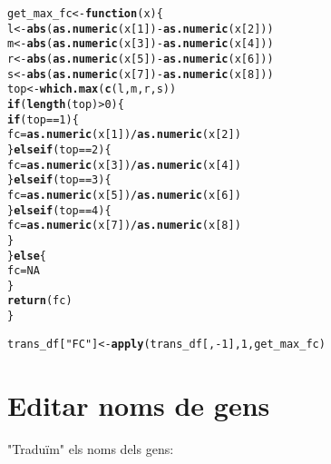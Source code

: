 \documentclass{article}\usepackage[]{graphicx}\usepackage[]{color}
\makeatletter
\newcommand{\hlnum}[1]{\textcolor[rgb]{0.686,0.059,0.569}{#1}}%
\newcommand{\hlstr}[1]{\textcolor[rgb]{0.192,0.494,0.8}{#1}}%
\newcommand{\hlopt}[1]{\textcolor[rgb]{0,0,0}{#1}}%
\newcommand{\hlstd}[1]{\textcolor[rgb]{0.345,0.345,0.345}{#1}}%
\newcommand{\hlkwa}[1]{\textcolor[rgb]{0.161,0.373,0.58}{\textbf{#1}}}%
\newcommand{\hlkwb}[1]{\textcolor[rgb]{0.69,0.353,0.396}{#1}}%
\newcommand{\hlkwc}[1]{\textcolor[rgb]{0.333,0.667,0.333}{#1}}%
\newcommand{\hlkwd}[1]{\textcolor[rgb]{0.737,0.353,0.396}{\textbf{#1}}}%
\newenvironment{kframe}{%
 \def\at@end@of@kframe{}%
 \ifinner\ifhmode%
  \def\at@end@of@kframe{\end{minipage}}%
  \begin{minipage}{\columnwidth}%
 \fi\fi%
 \def\FrameCommand##1{\hskip\@totalleftmargin \hskip-\fboxsep
 \colorbox{shadecolor}{##1}\hskip-\fboxsep
     \hskip-\linewidth \hskip-\@totalleftmargin \hskip\columnwidth}%
 \MakeFramed {\advance\hsize-\width
   \@totalleftmargin\z@ \linewidth\hsize
   \@setminipage}}%
 {\par\unskip\endMakeFramed%
 \at@end@of@kframe}
\newenvironment{knitrout}{}{} %
\makeatother
\begin{document}
\begin{knitrout}
\color{fgcolor}\begin{kframe}
\begin{alltt}
\hlstd{get_max_fc} \hlkwb{<-} \hlkwa{function}\hlstd{(}\hlkwc{x}\hlstd{)\{}
  \hlstd{l} \hlkwb{<-} \hlkwd{abs}\hlstd{(}\hlkwd{as.numeric}\hlstd{(x[}\hlnum{1}\hlstd{])} \hlopt{-} \hlkwd{as.numeric}\hlstd{(x[}\hlnum{2}\hlstd{]))}
  \hlstd{m} \hlkwb{<-} \hlkwd{abs}\hlstd{(}\hlkwd{as.numeric}\hlstd{(x[}\hlnum{3}\hlstd{])} \hlopt{-} \hlkwd{as.numeric}\hlstd{(x[}\hlnum{4}\hlstd{]))}
  \hlstd{r} \hlkwb{<-} \hlkwd{abs}\hlstd{(}\hlkwd{as.numeric}\hlstd{(x[}\hlnum{5}\hlstd{])} \hlopt{-} \hlkwd{as.numeric}\hlstd{(x[}\hlnum{6}\hlstd{]))}
  \hlstd{s} \hlkwb{<-} \hlkwd{abs}\hlstd{(}\hlkwd{as.numeric}\hlstd{(x[}\hlnum{7}\hlstd{])} \hlopt{-} \hlkwd{as.numeric}\hlstd{(x[}\hlnum{8}\hlstd{]))}
  \hlstd{top} \hlkwb{<-} \hlkwd{which.max}\hlstd{(}\hlkwd{c}\hlstd{(l,m,r,s))}
  \hlkwa{if} \hlstd{(}\hlkwd{length}\hlstd{(top)} \hlopt{>} \hlnum{0}\hlstd{)\{}
    \hlkwa{if} \hlstd{(top} \hlopt{==} \hlnum{1}\hlstd{) \{}
      \hlstd{fc} \hlkwb{=} \hlkwd{as.numeric}\hlstd{(x[}\hlnum{1}\hlstd{])}\hlopt{/}\hlkwd{as.numeric}\hlstd{(x[}\hlnum{2}\hlstd{])}
    \hlstd{\}} \hlkwa{else if} \hlstd{(top} \hlopt{==} \hlnum{2}\hlstd{) \{}
      \hlstd{fc} \hlkwb{=} \hlkwd{as.numeric}\hlstd{(x[}\hlnum{3}\hlstd{])}\hlopt{/}\hlkwd{as.numeric}\hlstd{(x[}\hlnum{4}\hlstd{])}
    \hlstd{\}} \hlkwa{else if} \hlstd{(top} \hlopt{==} \hlnum{3}\hlstd{) \{}
      \hlstd{fc} \hlkwb{=} \hlkwd{as.numeric}\hlstd{(x[}\hlnum{5}\hlstd{])}\hlopt{/}\hlkwd{as.numeric}\hlstd{(x[}\hlnum{6}\hlstd{])}
    \hlstd{\}} \hlkwa{else if} \hlstd{(top} \hlopt{==} \hlnum{4}\hlstd{) \{}
      \hlstd{fc} \hlkwb{=} \hlkwd{as.numeric}\hlstd{(x[}\hlnum{7}\hlstd{])}\hlopt{/}\hlkwd{as.numeric}\hlstd{(x[}\hlnum{8}\hlstd{])}
    \hlstd{\}}
  \hlstd{\}} \hlkwa{else} \hlstd{\{}
    \hlstd{fc} \hlkwb{=} \hlnum{NA}
  \hlstd{\}}
  \hlkwd{return}\hlstd{(fc)}
\hlstd{\}}

\hlstd{trans_df[}\hlstr{"FC"}\hlstd{]} \hlkwb{<-} \hlkwd{apply}\hlstd{(trans_df[,}\hlopt{-}\hlnum{1}\hlstd{],} \hlnum{1}\hlstd{, get_max_fc)}
\end{alltt}
\end{kframe}
\end{knitrout}

\section{Editar noms de gens}
"Traduïm" els noms dels gens:
\end{document}
